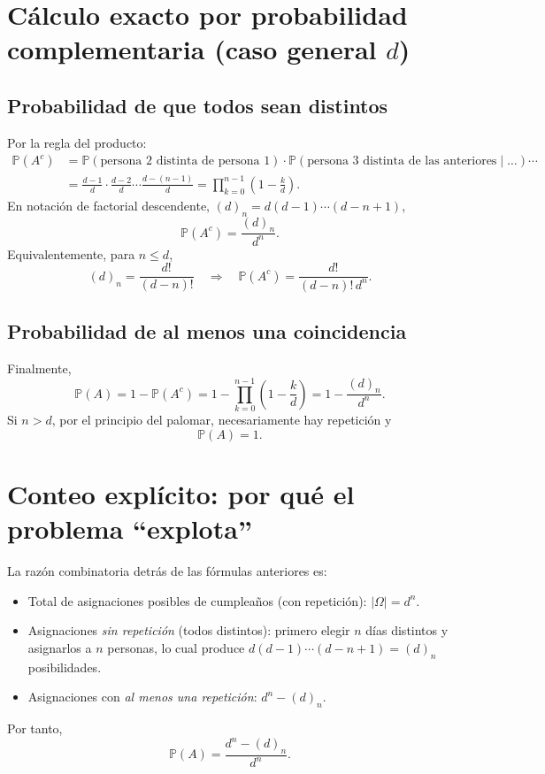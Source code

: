\documentclass[11pt, letterpaper]{article}
\begin{document}
\section{Cálculo exacto por probabilidad complementaria (caso general $d$)}

\subsection{Probabilidad de que todos sean distintos}
Por la regla del producto:
\begin{align}
\mathbb{P}(A^c)
&= \mathbb{P}(\text{persona 2 distinta de persona 1})\cdot
\mathbb{P}(\text{persona 3 distinta de las anteriores}\mid \dots)\cdots \nonumber\\
&= \frac{d-1}{d}\cdot \frac{d-2}{d}\cdots \frac{d-(n-1)}{d}
= \prod_{k=0}^{n-1}\left(1-\frac{k}{d}\right).
\end{align}
En notación de factorial descendente, $(d)_n=d(d-1)\cdots(d-n+1)$,
\[
\mathbb{P}(A^c)=\frac{(d)_n}{d^n}.
\]
Equivalentemente, para $n\le d$,
\[
(d)_n=\frac{d!}{(d-n)!}
\quad\Longrightarrow\quad
\mathbb{P}(A^c)=\frac{d!}{(d-n)!\,d^n}.
\]

\subsection{Probabilidad de al menos una coincidencia}
Finalmente,
\begin{equation}
\boxed{
\mathbb{P}(A)=1-\mathbb{P}(A^c)
=1-\prod_{k=0}^{n-1}\left(1-\frac{k}{d}\right)
=1-\frac{(d)_n}{d^n}.
}
\end{equation}
Si $n>d$, por el principio del palomar, necesariamente hay repetición y
\[
\mathbb{P}(A)=1.
\]

\section{Conteo explícito: por qué el problema ``explota''}

La razón combinatoria detrás de las fórmulas anteriores es:
\begin{itemize}
\item Total de asignaciones posibles de cumpleaños (con repetición): $|\Omega| = d^n$.
\item Asignaciones \emph{sin repetición} (todos distintos): primero elegir $n$ días distintos y asignarlos a $n$ personas,
lo cual produce $d(d-1)\cdots(d-n+1)=(d)_n$ posibilidades.
\item Asignaciones con \emph{al menos una repetición}: $d^n-(d)_n$.
\end{itemize}
Por tanto,
\[
\mathbb{P}(A)=\frac{d^n-(d)_n}{d^n}.
\]
\end{document}
